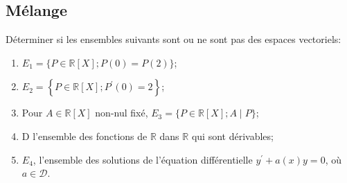     \subsection{Mélange}
    Déterminer si les ensembles suivants sont ou ne sont pas des espaces vectoriels:
    \begin{enumerate}
      \item $E_1=\{P \in \mathbb{R}[X] ; P(0)=P(2)\}$;

      \vspace{1em}

      \item $E_2=\left\{P \in \mathbb{R}[X] ; P^{\prime}(0)=2\right\}$;
      
      \vspace{1em}

      \item Pour $A \in \mathbb{R}[X]$ non-nul fixé, $E_3=\{P \in \mathbb{R}[X] ; A \mid P\}$;
      
      \vspace{1em}

      \item D l'ensemble des fonctions de $\mathbb{R}$ dans $\mathbb{R}$ qui sont dérivables;
      
      \vspace{1em}

      \item $E_4$, l'ensemble des solutions de l'équation différentielle $y^{\prime}+a(x) y=0$, où $a \in \mathcal{D}$.
      

\end{enumerate}
